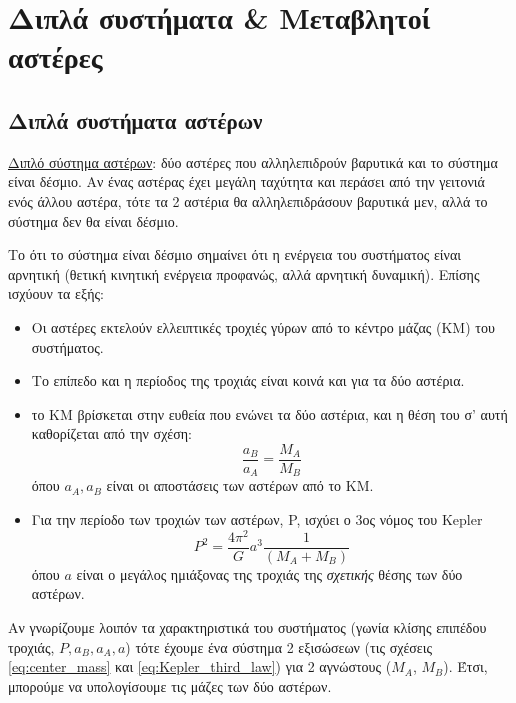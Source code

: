 \chapter{Διπλά συστήματα \& Μεταβλητοί αστέρες}
\label{ch:Chapter7}
{\hypersetup{linkcolor=black, pdfborder=0 0 1}
	\minitoc
}

\section{Διπλά συστήματα αστέρων}


\underline{Διπλό σύστημα αστέρων}: {\color{blue}δύο αστέρες που αλληλεπιδρούν βαρυτικά και το σύστημα είναι δέσμιο.} Αν ένας αστέρας έχει μεγάλη ταχύτητα και περάσει από την γειτονιά ενός άλλου αστέρα, τότε τα 2 αστέρια θα αλληλεπιδράσουν βαρυτικά μεν, αλλά το σύστημα δεν θα είναι δέσμιο.

Το ότι το σύστημα είναι δέσμιο σημαίνει ότι η ενέργεια του συστήματος είναι αρνητική (θετική κινητική ενέργεια προφανώς, αλλά αρνητική δυναμική). Επίσης ισχύουν τα εξής:

\begin{itemize}
    \item Οι αστέρες εκτελούν ελλειπτικές τροχιές γύρων από το κέντρο μάζας (ΚΜ) του συστήματος.
    \item Το επίπεδο και η περίοδος της τροχιάς είναι κοινά και για τα δύο αστέρια.
    \item το ΚΜ βρίσκεται στην ευθεία που ενώνει τα δύο αστέρια, και η θέση του σ' αυτή καθορίζεται από την σχέση:
        \begin{equation}
            \label{eq:center_mass}
            \frac{a_B}{a_A} = \frac{M_A}{M_B}
        \end{equation}
        όπου $a_A, a_B$ είναι οι αποστάσεις των αστέρων από το ΚΜ.
    \item Για την περίοδο των τροχιών των αστέρων, P, ισχύει ο 3ος νόμος του Kepler
        \begin{equation}
            \label{eq:Kepler_third_law}
            P^2 = \frac{4\pi^2}{G}a^3 \frac{1}{(M_A + M_B)}
        \end{equation}
        όπου $a$ είναι ο μεγάλος ημιάξονας της τροχιάς της \textit{σχετικής} θέσης των δύο αστέρων.
\end{itemize}

Αν γνωρίζουμε λοιπόν τα χαρακτηριστικά του συστήματος (γωνία κλίσης επιπέδου τροχιάς, $P, a_B, a_A, a$) τότε έχουμε ένα σύστημα 2 εξισώσεων (τις σχέσεις \eqref{eq:center_mass} και \eqref{eq:Kepler_third_law}) για 2 αγνώστους ($M_A$, $M_B$).  Έτσι, μπορούμε να υπολογίσουμε τις μάζες των δύο αστέρων.






